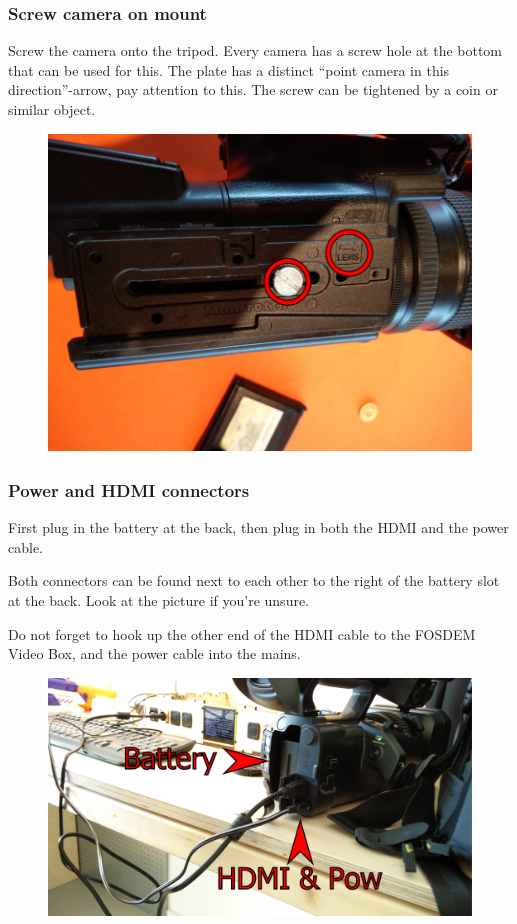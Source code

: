 \documentclass{article}
\begin{document}
\subsubsection{Screw camera on mount}
Screw the camera onto the tripod. Every camera has a screw hole at the bottom that can be used for this. The plate has a distinct ``point camera in this direction''-arrow, pay attention to this. The screw can be tightened by a coin or similar object.

\begin{figure}[H]
  \centering
  \includegraphics[width = 120mm]{Cam00.jpg}
\end{figure}

\subsubsection{Power and HDMI connectors}
First plug in the battery at the back, then plug in both the HDMI and the power cable.

Both connectors can be found next to each other to the right of the battery slot at the back.
Look at the picture if you're unsure.

Do not forget to hook up the other end of the HDMI cable to the FOSDEM Video Box, and the power cable into the mains.

\begin{figure}[H]
  \centering
\includegraphics[width = 120mm]{Sony01.jpg}
\end{figure}
\end{document}
